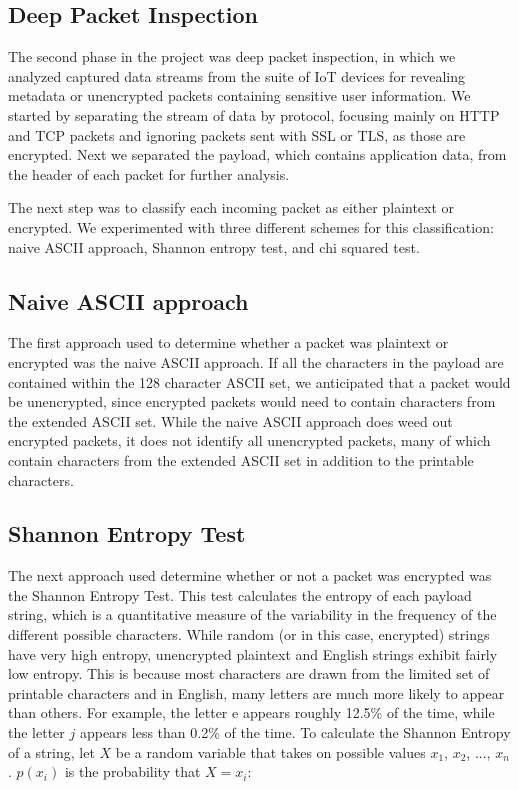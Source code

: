 \subsection{Deep Packet Inspection}

The second phase in the project was deep packet inspection, in which we analyzed captured data streams from the suite of IoT devices for revealing metadata or unencrypted packets containing sensitive user information. We started by separating the stream of data by protocol, focusing mainly on HTTP and TCP packets and ignoring packets sent with SSL or TLS, as those are encrypted. Next we separated the payload, which contains application data, from the header of each packet for further analysis. 

The next step was to classify each incoming packet as either plaintext or encrypted. We experimented with three different schemes for this classification: naive ASCII approach, Shannon entropy test, and chi squared test. 

\subsection{Naive ASCII approach}
The first approach used to determine whether a packet was plaintext or encrypted was the naive ASCII approach. If all the characters in the payload are contained within the 128 character ASCII set, we anticipated that a packet would be unencrypted, since encrypted packets would need to contain characters from the extended ASCII set. While the naive ASCII approach does weed out encrypted packets, it does not identify all unencrypted packets, many of which contain characters from the extended ASCII set in addition to the printable characters. 

\subsection{Shannon Entropy Test}
The next approach used determine whether or not a packet was encrypted was the Shannon Entropy Test. This test calculates the entropy of each payload string, which is a quantitative measure of the variability in the frequency of the different possible characters. While random (or in this case, encrypted) strings have very high entropy, unencrypted plaintext and English strings exhibit fairly low entropy. This is because most characters are drawn from the limited set of printable characters and in English, many letters are much more likely to appear than others. For example, the letter e appears roughly 12.5\% of the time, while the letter $j$ appears less than 0.2\% of the time. To calculate the Shannon Entropy of a string, let $X$ be a random variable that takes on possible values $x_1$, $x_2$, ..., $x_n$. $p(x_i)$ is the probability that $X = x_i$:

